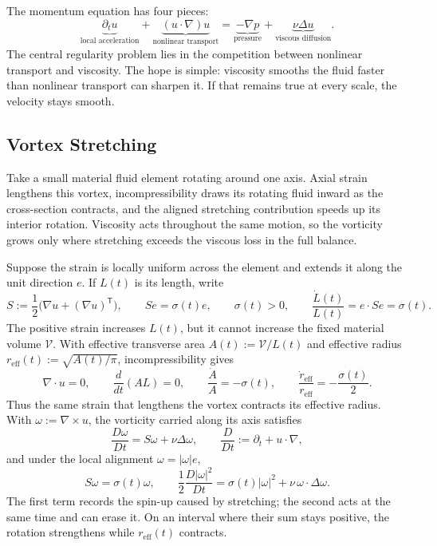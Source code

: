
The momentum equation has four pieces:
\[
  \underbrace{\partial_t u}_{\text{local acceleration}}
  +
  \underbrace{(u\cdot\nabla)u}_{\text{nonlinear transport}}
  =
  \underbrace{-\nabla p}_{\text{pressure}}
  +
  \underbrace{\nu\Delta u}_{\text{viscous diffusion}}.
\]
The central regularity problem lies in the competition between nonlinear transport and viscosity.
The hope is simple: viscosity smooths the fluid faster than nonlinear transport can sharpen it.
If that remains true at every scale, the velocity stays smooth.

\subsection{Vortex Stretching}\label{sub:ThePerfectlyStretchingVortex}

Take a small material fluid element rotating around one axis. Axial strain lengthens this vortex, incompressibility draws its rotating fluid inward as the cross-section contracts, and the aligned stretching contribution speeds up its interior rotation. Viscosity acts throughout the same motion, so the vorticity grows only where stretching exceeds the viscous loss in the full balance.

Suppose the strain is locally uniform across the element and extends it along the unit direction \(e\). If \(L(t)\) is its length, write
\[
  S:=\frac12\bigl(\nabla u+(\nabla u)^{\mathsf T}\bigr),
  \qquad
  Se=\sigma(t)e,
  \qquad
  \sigma(t)>0,
  \qquad
  \frac{\dot L(t)}{L(t)}
  =
  e\cdot Se
  =
  \sigma(t).
\]
The positive strain increases \(L(t)\), but it cannot increase the fixed material volume \(\mathcal V\). With effective transverse area \(A(t):=\mathcal V/L(t)\) and effective radius \(r_{\mathrm{eff}}(t):=\sqrt{A(t)/\pi}\), incompressibility gives
\[
  \nabla\cdot u=0,
  \qquad
  \frac{d}{dt}(A L)=0,
  \qquad
  \frac{\dot A}{A}=-\sigma(t),
  \qquad
  \frac{\dot r_{\mathrm{eff}}}{r_{\mathrm{eff}}}
  =
  -\frac{\sigma(t)}{2}.
\]
Thus the same strain that lengthens the vortex contracts its effective radius. With \(\omega:=\nabla\times u\), the vorticity carried along its axis satisfies
\[
  \frac{D\omega}{Dt}
  =
  S\omega+\nu\Delta\omega,
  \qquad
  \frac{D}{Dt}
  :=
  \partial_t+u\cdot\nabla,
\]
and under the local alignment \(\omega=|\omega|e\),
\[
  S\omega
  =
  \sigma(t)\omega,
  \qquad
  \frac12\frac{D|\omega|^2}{Dt}
  =
  \sigma(t)|\omega|^2
  +
  \nu\,\omega\cdot\Delta\omega.
\]
The first term records the spin-up caused by stretching; the second acts at the same time and can erase it. On an interval where their sum stays positive, the rotation strengthens while \(r_{\mathrm{eff}}(t)\) contracts.


